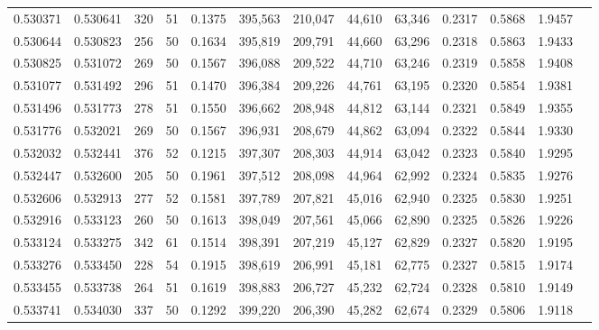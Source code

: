 \begin{tabular}{rrrrrrrrrrrrr}
0.530371 & 0.530641 &   320 &  51 &                                     0.1375 & 395,563 & 210,047 &  44,610 &  63,346 & 0.2317 & 0.5868 & 1.9457 \\
0.530644 & 0.530823 &   256 &  50 &                                     0.1634 & 395,819 & 209,791 &  44,660 &  63,296 & 0.2318 & 0.5863 & 1.9433 \\
0.530825 & 0.531072 &   269 &  50 &                                     0.1567 & 396,088 & 209,522 &  44,710 &  63,246 & 0.2319 & 0.5858 & 1.9408 \\
0.531077 & 0.531492 &   296 &  51 &                                     0.1470 & 396,384 & 209,226 &  44,761 &  63,195 & 0.2320 & 0.5854 & 1.9381 \\
0.531496 & 0.531773 &   278 &  51 &                                     0.1550 & 396,662 & 208,948 &  44,812 &  63,144 & 0.2321 & 0.5849 & 1.9355 \\
0.531776 & 0.532021 &   269 &  50 &                                     0.1567 & 396,931 & 208,679 &  44,862 &  63,094 & 0.2322 & 0.5844 & 1.9330 \\
0.532032 & 0.532441 &   376 &  52 &                                     0.1215 & 397,307 & 208,303 &  44,914 &  63,042 & 0.2323 & 0.5840 & 1.9295 \\
0.532447 & 0.532600 &   205 &  50 &                                     0.1961 & 397,512 & 208,098 &  44,964 &  62,992 & 0.2324 & 0.5835 & 1.9276 \\
0.532606 & 0.532913 &   277 &  52 &                                     0.1581 & 397,789 & 207,821 &  45,016 &  62,940 & 0.2325 & 0.5830 & 1.9251 \\
0.532916 & 0.533123 &   260 &  50 &                                     0.1613 & 398,049 & 207,561 &  45,066 &  62,890 & 0.2325 & 0.5826 & 1.9226 \\
0.533124 & 0.533275 &   342 &  61 &                                     0.1514 & 398,391 & 207,219 &  45,127 &  62,829 & 0.2327 & 0.5820 & 1.9195 \\
0.533276 & 0.533450 &   228 &  54 &                                     0.1915 & 398,619 & 206,991 &  45,181 &  62,775 & 0.2327 & 0.5815 & 1.9174 \\
0.533455 & 0.533738 &   264 &  51 &                                     0.1619 & 398,883 & 206,727 &  45,232 &  62,724 & 0.2328 & 0.5810 & 1.9149 \\
0.533741 & 0.534030 &   337 &  50 &                                     0.1292 & 399,220 & 206,390 &  45,282 &  62,674 & 0.2329 & 0.5806 & 1.9118 \\

\end{tabular}
